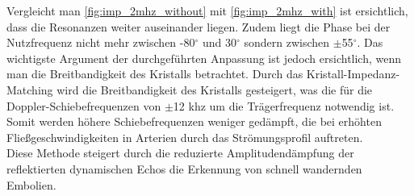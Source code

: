 Vergleicht man \autoref{fig:imp_2mhz_without} mit \autoref{fig:imp_2mhz_with} ist ersichtlich, dass die Resonanzen weiter auseinander liegen. Zudem liegt die Phase bei der Nutzfrequenz nicht mehr zwischen -80$^\circ$ und 30$^\circ$ sondern zwischen $\pm$55$^\circ$. Das wichtigste Argument der durchgeführten Anpassung ist jedoch ersichtlich, wenn man die Breitbandigkeit des Kristalls betrachtet. Durch das Kristall-Impedanz-Matching wird die Breitbandigkeit des Kristalls gesteigert, was die für die Doppler-Schiebefrequenzen von $\pm$12 \ac{khz} um die Trägerfrequenz notwendig ist. Somit werden höhere Schiebefrequenzen weniger gedämpft, die bei erhöhten Fließgeschwindigkeiten in Arterien durch das Strömungsprofil auftreten.\\
Diese Methode steigert durch die reduzierte Amplitudendämpfung der reflektierten dynamischen Echos die Erkennung von schnell wandernden Embolien.
